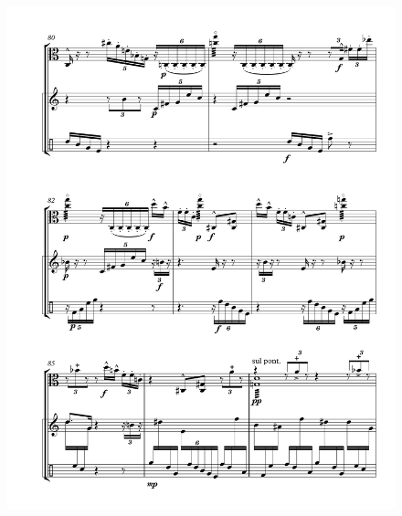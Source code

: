\begin{figure}[htbp]
    \centering
	\includegraphics[width=6.5in]{figures/Viola_Percussion_12.pdf}
\end{figure}

